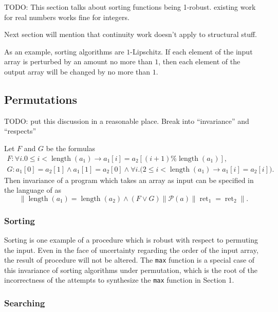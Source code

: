 \documentclass{llncs}
\DeclareMathOperator{\Perm}{Perm}
\DeclareMathOperator{\len}{length}
\DeclareMathOperator{\ret}{ret}
\begin{document}
    TODO: This section talks about sorting functions being 1-robust. existing
    work for real numbers works fine for integers.

    Next section will mention that continuity work doesn't apply to structural
    stuff.

    As an example, sorting algorithms are
    \(1\)-Lipschitz.  If each element of the input array is perturbed by an amount
    no more than \(1\), then each element of the output array will be changed by no
    more than \(1\).

  \subsection{Permutations}


    TODO: put this discussion in a reasonable place.
    Break into ``invariance'' and ``respects''

    Let \(F\) and \(G\) be the formulas
    \begin{gather*}
        F:  \forall i. 0 \leq i < \len(a_{1}) \rightarrow a_{1}[i] = a_{2}[(i+1)\%\len(a_{1})],\\
            G: a_{1}[0] = a_{2}[1] \wedge a_{1}[1] = a_{2}[0] \wedge 
              \forall i.\big( 2 \leq i < \len(a_{1}) \rightarrow a_{1}[i] = a_{2}[i] \big).
    \end{gather*}
    Then invariance of a program which takes an array as input can be specified
    in the language of \cite{sousa16} as
    \[
      \|\len(a_{1}) = \len(a_{2}) \wedge (F \vee G)\| 
        \mathcal{P}(a) \|\ret_{1} = \ret_{2}\|.
    \]

  \subsubsection{Sorting}

    Sorting is one example of a procedure which is robust with respect to permuting
    the input.  Even in the face of uncertainty regarding the order of the input
    array, the result of procedure will not be altered.  The \verb!max! function is
    a special case of this invariance of sorting algorithms under permutation, which
    is the root of the incorrectness of the attempts to synthesize the \verb!max!
    function in Section 1.

  \subsubsection{Searching}
\end{document}
